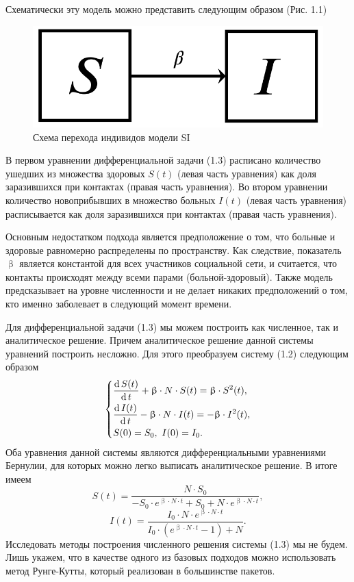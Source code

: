 \documentclass[a4paper, 14pt]{extreport}
\numberwithin{equation}{section}
\renewcommand{\beta}{\upbeta}
\renewcommand{\d}{\operatorname{d}}
\begin{document}
	Схематически эту модель можно представить следующим образом (Рис. 1.1)
	\begin{figure}[h]
		\centering
		\includegraphics[scale=0.25]{images/img05}
		\caption{Схема перехода индивидов модели SI}
		\label{fig:img05}
	\end{figure}
	
	В первом уравнении дифференциальной задачи (1.3) расписано количество ушедших из множества здоровых $S(t)$ (левая часть уравнения) как доля заразившихся при контактах (правая часть уравнения). Во втором уравнении количество новоприбывших в множество больных $I(t)$ (левая часть уравнения) расписывается как доля заразившихся при контактах (правая часть уравнения). 
	
	Основным недостатком подхода является предположение о том, что больные и здоровые равномерно распределены по пространству. Как следствие, показатель $\beta$ является константой для всех участников социальной сети, и считается, что контакты происходят между всеми парами (больной-здоровый). Также модель предсказывает на уровне численности и не делает никаких предположений о том, кто именно заболевает в следующий момент времени.
	
	Для дифференциальной задачи (1.3) мы можем построить как численное, так и аналитическое решение. Причем аналитическое решение данной системы уравнений построить несложно. Для этого преобразуем систему (1.2) следующим образом
	$$
		\begin{dcases}
			\dfrac{\d S(t)}{\d t} + \beta\cdot  N \cdot S(t) = \beta \cdot S^2(t),\\
			\dfrac{\d I(t)}{\d t} - \beta\cdot N\cdot I(t) =  -\beta\cdot  I^2(t),\\
			S(0) = S_0,\ I(0) = I_0.
		\end{dcases}
	$$
	Оба уравнения данной системы являются дифференциальными уравнениями Бернулии, для которых можно легко выписать аналитическое решение. В итоге имеем
	\begin{equation}
		S(t) = \dfrac{N \cdot S_0}{-S_0 \cdot e^{\beta \cdot N\cdot t} + S_0 + N\cdot e^{\beta \cdot N \cdot t}},
	\end{equation}
	\begin{equation}
		I(t) = \dfrac{I_0 \cdot N \cdot e^{\beta \cdot N \cdot t}}{I_0\cdot(e^{\beta \cdot N \cdot t} - 1) + N}.
	\end{equation}
	Исследовать методы построения численного решения системы (1.3) мы не будем. Лишь укажем, что в качестве одного из базовых подходов можно использовать метод Рунге-Кутты, который реализован в большинстве пакетов.
	
\end{document}
